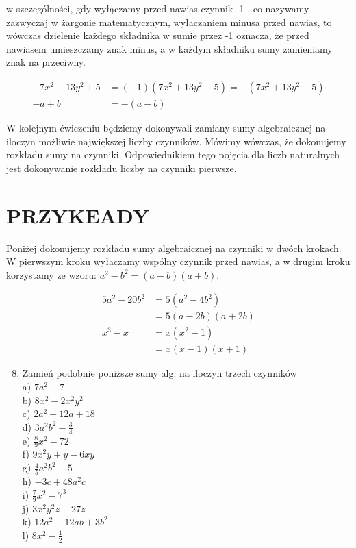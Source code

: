 \documentclass[10pt]{article}
\begin{document}
w szczególności, gdy wyłączamy przed nawias czynnik -1 , co nazywamy zazwyczaj w żargonie matematycznym, wyłaczaniem minusa przed nawias, to wówczas dzielenie każdego składnika w sumie przez -1 oznacza, że przed nawiasem umieszczamy znak minus, a w każdym składniku sumy zamieniamy znak na przeciwny.

\[
\begin{aligned}
-7 x^{2}-13 y^{2}+5 & =(-1)\left(7 x^{2}+13 y^{2}-5\right)=-\left(7 x^{2}+13 y^{2}-5\right) \\
-a+b & =-(a-b)
\end{aligned}
\]

W kolejnym ćwiczeniu będziemy dokonywali zamiany sumy algebraicznej na iloczyn możliwie największej liczby czynników. Mówimy wówczas, że dokonujemy rozkładu sumy na czynniki. Odpowiednikiem tego pojęcia dla liczb naturalnych jest dokonywanie rozkładu liczby na czynniki pierwsze.

\section*{PRZYKEADY}
Poniżej dokonujemy rozkładu sumy algebraicznej na czynniki w dwóch krokach. W pierwszym kroku wyłaczamy wspólny czynnik przed nawias, a w drugim kroku korzystamy ze wzoru: \(a^{2}-b^{2}=(a-b)(a+b)\).

\[
\begin{aligned}
5 a^{2}-20 b^{2} & =5\left(a^{2}-4 b^{2}\right) \\
& =5(a-2 b)(a+2 b) \\
x^{3}-x & =x\left(x^{2}-1\right) \\
& =x(x-1)(x+1)
\end{aligned}
\]

\begin{enumerate}
  \setcounter{enumi}{7}
  \item Zamień podobnie poniższe sumy alg. na iloczyn trzech czynników\\
a) \(7 a^{2}-7\)\\
b) \(8 x^{2}-2 x^{2} y^{2}\)\\
c) \(2 a^{2}-12 a+18\)\\
d) \(3 a^{2} b^{2}-\frac{3}{4}\)\\
e) \(\frac{8}{9} x^{2}-72\)\\
f) \(9 x^{2} y+y-6 x y\)\\
g) \(\frac{4}{5} a^{2} b^{2}-5\)\\
h) \(-3 c+48 a^{2} c\)\\
i) \(\frac{7}{9} x^{2}-7^{3}\)\\
j) \(3 x^{2} y^{2} z-27 z\)\\
k) \(12 a^{2}-12 a b+3 b^{2}\)\\
l) \(8 x^{2}-\frac{1}{2}\)
\end{enumerate}
\end{document}
